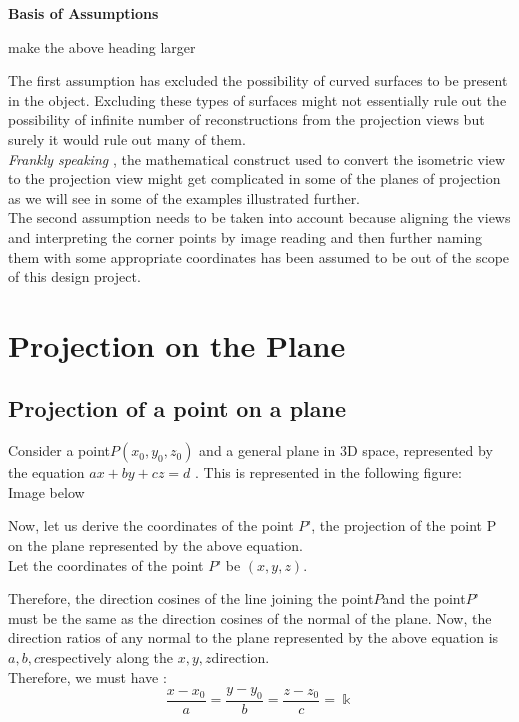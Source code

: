 \documentclass[12pt]{report}
\begin{document}
\textbf{Basis of Assumptions}

{make the above heading larger}

The first assumption has excluded the possibility of curved surfaces to be present in the object. Excluding these types of surfaces might not essentially rule out the possibility of infinite number of reconstructions from the projection views but surely it would rule out many of them. 
\\
\vspace{0.2cm}
\hspace{1cm} \textit{ Frankly speaking } , the mathematical construct used to convert the isometric view to the projection view might get complicated in some of the planes of projection as we will see in some of the examples illustrated further.
\\
\vspace{0.2cm}
The second assumption needs to be taken into account because aligning the views and interpreting the corner points by image reading and then further naming them with some appropriate coordinates has been assumed to be out of the scope of this design project.
\\

\section{Projection on the Plane}

\subsection{Projection of a point on a plane}

Consider a point$ P (x_{0}, y_{0}, z_{0}) $ and a general plane in 3D space, represented by the equation $ax + by + cz = d$ .  This is represented in the following figure: \\
{Image below}
\vspace{4cm}

Now, let us derive the coordinates of the point $P’$, the projection of the point P on the plane  represented by the above equation.
\\
\vspace{0.3cm}
Let the coordinates of the point $ P’ $ be $(x, y, z)$.
\\
\vspace{0.3cm}

Therefore, the direction cosines of the line joining the point$ P $and the point$ P’$ must be the same as the direction cosines of the normal of the plane. Now, the direction ratios of any normal to the plane represented by the above equation is $a, b, c $respectively along the $x, y, z $direction.
\\
\vspace{0.3cm}
Therefore, we must have : 
\[ \dfrac{x - x_{0}}{a} = \dfrac{y - y_{0}}{b} = \dfrac{z - z_{0}}{c} = \Bbbk \]
\end{document}
